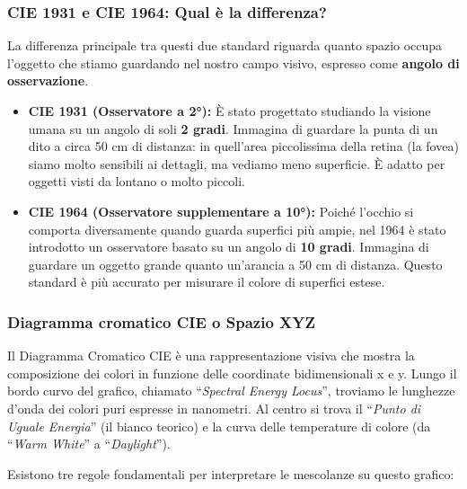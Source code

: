 \documentclass[
]{article}
\providecommand{\tightlist}{%
  \setlength{\itemsep}{0pt}\setlength{\parskip}{0pt}}
\begin{document}
\hypertarget{cie-1931-e-cie-1964-qual-uxe8-la-differenza}{%
\subsubsection{\texorpdfstring{\textbf{CIE 1931 e CIE 1964: Qual è la differenza?}}{CIE 1931 e CIE 1964: Qual è la differenza?}}\label{cie-1931-e-cie-1964-qual-uxe8-la-differenza}}

La differenza principale tra questi due standard riguarda quanto spazio occupa l'oggetto che stiamo guardando nel nostro campo visivo, espresso come \textbf{angolo di osservazione}.

\begin{itemize}
\tightlist
\item
  \textbf{CIE 1931 (Osservatore a 2°):} È stato progettato studiando la visione umana su un angolo di soli \textbf{2 gradi}. Immagina di guardare la punta di un dito a circa 50 cm di distanza: in quell'area piccolissima della retina (la fovea) siamo molto sensibili ai dettagli, ma vediamo meno superficie. È adatto per oggetti visti da lontano o molto piccoli.
\item
  \textbf{CIE 1964 (Osservatore supplementare a 10°):} Poiché l'occhio si comporta diversamente quando guarda superfici più ampie, nel 1964 è stato introdotto un osservatore basato su un angolo di \textbf{10 gradi}. Immagina di guardare un oggetto grande quanto un'arancia a 50 cm di distanza. Questo standard è più accurato per misurare il colore di superfici estese.
\end{itemize}

\hypertarget{diagramma-cromatico-cie-o-spazio-xyz}{%
\subsubsection{Diagramma cromatico CIE o Spazio XYZ}\label{diagramma-cromatico-cie-o-spazio-xyz}}

Il Diagramma Cromatico CIE è una rappresentazione visiva che mostra la composizione dei colori in funzione delle coordinate bidimensionali x e y. Lungo il bordo curvo del grafico, chiamato ``\emph{Spectral Energy Locus}'', troviamo le lunghezze d'onda dei colori puri espresse in nanometri. Al centro si trova il ``\emph{Punto di Uguale Energia}'' (il bianco teorico) e la curva delle temperature di colore (da ``\emph{Warm White}'' a ``\emph{Daylight}'').

Esistono tre regole fondamentali per interpretare le mescolanze su questo grafico:
\end{document}
